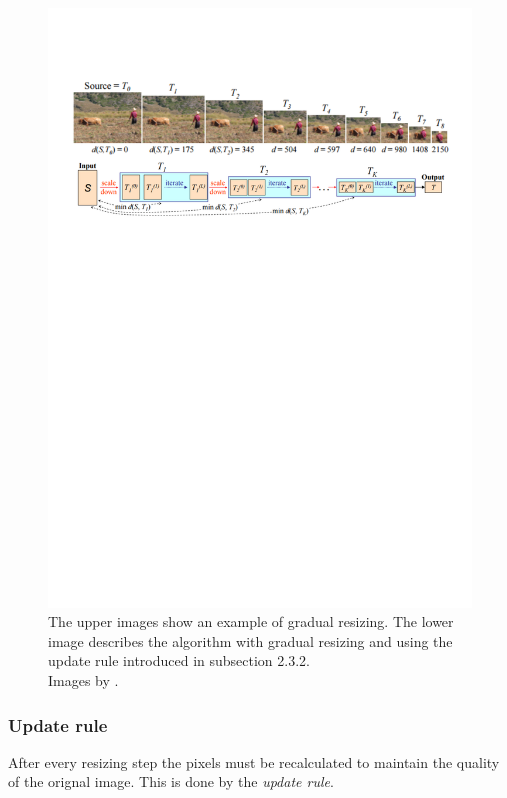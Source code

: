 \begin{figure}[h]
\centering
\includegraphics[scale=0.8]{img/gradualresizing}
\caption[Gradual resizing]{The upper images show an example of gradual resizing. The lower image describes the algorithm with gradual resizing and using the update rule introduced in subsection 2.3.2.\\ Images by \cite{bisi}. }
\label{fig:Gradual resizing}
\end{figure}

\subsubsection{Update rule}
After every resizing step the pixels must be recalculated to maintain the quality of the orignal image. This is done by the \textit{update rule}.

